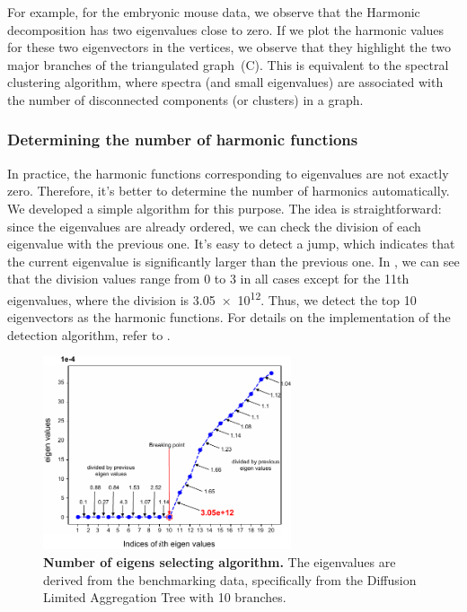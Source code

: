 For example, for the embryonic mouse data, we observe that the Harmonic decomposition has two eigenvalues close to zero. If we plot the harmonic values for these two eigenvectors in the vertices, we observe that they highlight the two major branches of the triangulated graph~(C). This is equivalent to the spectral clustering algorithm, where spectra (and small eigenvalues) are associated with the number of disconnected components (or clusters) in a graph.

\subsubsection{Determining the number of harmonic functions}
In practice, the harmonic functions corresponding to eigenvalues are not exactly zero. Therefore, it's better to determine the number of harmonics automatically. We developed a simple algorithm for this purpose. The idea is straightforward: since the eigenvalues are already ordered, we can check the division of each eigenvalue with the previous one. It's easy to detect a jump, which indicates that the current eigenvalue is significantly larger than the previous one. In , we can see that the division values range from 0 to 3 in all cases except for the 11th eigenvalues, where the division is \num{3.05e+12}. Thus, we detect the top 10 eigenvectors as the harmonic functions. For details on the implementation of the detection algorithm, refer to .

\begin{figure}[!ht]
    \centering
    \includegraphics[width=0.65\textwidth]{breakingpoint/fig}
    \vspace{0.1cm}
    \caption[Number of eigens selecting algorithm.]{\textbf{Number of eigens selecting algorithm.} The eigenvalues are derived from the benchmarking data, specifically from the Diffusion Limited Aggregation Tree with 10 branches.}
    \label{fig:breakingpoint}
\end{figure}

